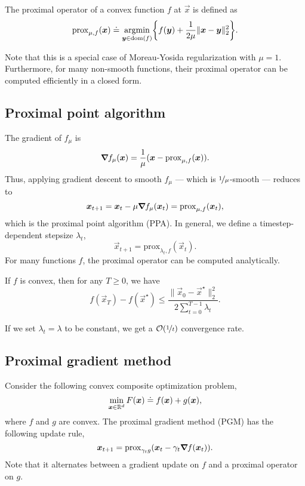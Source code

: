 \begin{definition}
    The proximal operator of a convex function $f$ at $\vec{x}$ is defined as \[
        \mathrm{prox}_{\mu,f}(\vec{x}) \doteq \argmin_{\vec{y} \in \dom{f}} \lft\{ f(\vec{y}) + \frac{1}{2 \mu} \| \vec{x} - \vec{y} \|_2^2 \rgt\}.
    \]
\end{definition}
Note that this is a special case of Moreau-Yosida regularization with $\mu = 1$. Furthermore, for
many non-smooth functions, their proximal operator can be computed efficiently in a closed form.

\subsection{Proximal point algorithm}

The gradient of $f_{\mu}$ is \[
    \bm{\nabla}_{\! } f_{\mu}(\bm{x}) = \frac{1}{\mu} (\bm{x} - \mathrm{prox}_{\mu, f}(\bm{x})).
\]
Thus, applying gradient descent to smooth $f_{\mu}$ --- which is $\nicefrac{1}{\mu}$-smooth ---
reduces to \[
    \bm{x}_{t+1} = \bm{x}_t - \mu \bm{\nabla}_{\! } f_{\mu}(\bm{x}_t) = \mathrm{prox}_{\mu, f}(\bm{x}_t),
\]
which is the proximal point algorithm (PPA). In general, we define a timestep-dependent stepsize
$\lambda_t$, \[
    \vec{x}_{t+1} = \mathrm{prox}_{\lambda_t, f}(\vec{x}_t).
\]
For many functions $f$, the proximal operator can be computed analytically.

\begin{theorem}
    If $f$ is convex, then for any $T \geq 0$, we have \[
        f(\vec{x}_T) - f(\vec{x}^\star) \leq \frac{\| \vec{x}_0 - \vec{x}^\star \|_2^2}{2 \sum_{t=0}^{T-1} \lambda_t}.
    \]
\end{theorem}

If we set $\lambda_t = \lambda$ to be constant, we get a $\bigo{\nicefrac{1}{t}}$ convergence rate.

\subsection{Proximal gradient method}

Consider the following convex composite optimization problem, \[
    \min_{\bm{x} \in \mathbb{R}^d} F(\bm{x}) \doteq f(\bm{x}) + g(\bm{x}),
\]
where $f$ and $g$ are convex. The proximal
gradient method (PGM) has the following update rule, \[
    \bm{x}_{t+1} = \mathrm{prox}_{\gamma_t g}(\bm{x}_t - \gamma_t \bm{\nabla}_{\! } f(\bm{x}_t)).
\]
Note that it alternates between a gradient update on $f$ and a proximal operator on $g$.


